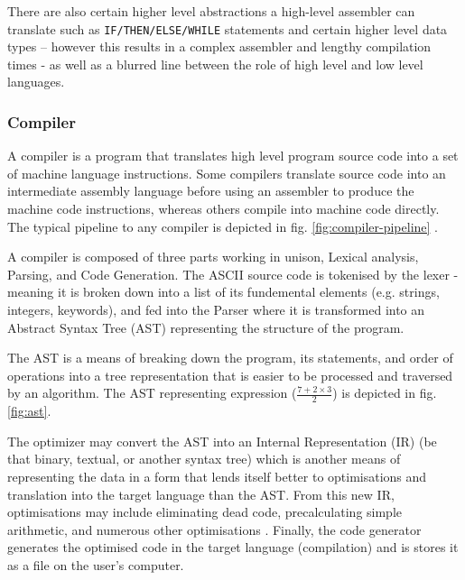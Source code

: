 There are also certain higher level abstractions a high-level assembler can translate such as \texttt{IF/THEN/ELSE/WHILE} statements and certain higher level data types – however this results in a complex assembler and lengthy compilation times - as well as a blurred line between the role of high level and low level languages. 

\subsubsection{Compiler}
\label{sec:Compiler}
A compiler is a program that translates high level program source code into a set of machine language instructions. Some compilers translate source code into an intermediate assembly language before using an assembler to produce the machine code instructions, whereas others compile into machine code directly. The typical pipeline to any compiler is depicted in fig. \ref{fig:compiler-pipeline} \textcite{Ball-WritingACompilerInGo}.

\bigskip

\begin{figure}%
    \centering
    \qquad
\end{figure}

\bigskip


A compiler is composed of three parts working in unison, Lexical analysis, Parsing, and Code Generation. The ASCII source code is tokenised by the lexer - meaning it is broken down into a list of its fundemental elements (e.g. strings, integers, keywords), and fed into the Parser where it is transformed into an Abstract Syntax Tree (AST) representing the structure of the program. 

The AST is a means of breaking down the program, its statements, and order of operations into a tree representation that is easier to be processed and traversed by an algorithm. The AST representing expression ($\frac{7+2\times3}{2}$) is depicted in fig. \ref{fig:ast}. 

The optimizer may convert the AST into an Internal Representation (IR) (be that binary, textual, or another syntax tree) which is another means of representing the data in a form that lends itself better to optimisations and translation into the target language than the AST. From this new IR, optimisations may include eliminating dead code, precalculating simple arithmetic, and numerous other optimisations \textcite{Ball-WritingACompilerInGo}. Finally, the code generator generates the optimised code in the target language (compilation) and is stores it as a file on the user's computer.



